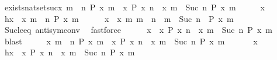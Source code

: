 \begin{isabellebody}
\isadelimproof
\isanewline
%
\endisadelimproof
\isanewline
{}\isamarkupfalse%
\ exists{\isacharunderscore}nat{\isacharunderscore}set{\isacharunderscore}suc{\isacharcolon}{\isacartoucheopen}{\isacharbraceleft}x{\isachardot}\ {\isasymexists}m\ {\isasymge}\ n{\isachardot}\ P\ x\ m{\isacharbraceright}\ {\isacharequal}\ {\isacharbraceleft}x{\isachardot}\ P\ x\ n{\isacharbraceright}\ {\isasymunion}\ {\isacharbraceleft}x{\isachardot}\ {\isasymexists}m\ {\isasymge}\ Suc\ n{\isachardot}\ P\ x\ m{\isacharbraceright}{\isacartoucheclose}\isanewline
%
\isadelimproof
%
\endisadelimproof
%
\isatagproof
{}\isamarkupfalse%
\isanewline
\ \ \isacommand{{\isacharbraceleft}}\isamarkupfalse%
\ \isamarkupfalse%
\ x\ \isamarkupfalse%
\ h{\isacharcolon}{\isacartoucheopen}x\ {\isasymin}\ {\isacharbraceleft}x{\isachardot}\ {\isasymexists}m\ {\isasymge}\ n{\isachardot}\ P\ x\ m{\isacharbraceright}{\isacartoucheclose}\isanewline
\ \ \ \ \isamarkupfalse%
\ {\isacartoucheopen}x\ {\isasymin}\ {\isacharbraceleft}x{\isachardot}\ {\isasymexists}m{\isachardot}\ {\isacharparenleft}m\ {\isacharequal}\ n\ {\isasymor}\ m\ {\isasymge}\ Suc\ n{\isacharparenright}\ {\isasymand}\ P\ x\ m{\isacharbraceright}{\isacartoucheclose}\isanewline
\ \ \ \ \ \ \isamarkupfalse%
\ Suc{\isacharunderscore}le{\isacharunderscore}eq\ antisym{\isacharunderscore}conv{}\ \isamarkupfalse%
\ fastforce\isanewline
\ \ \ \ \isamarkupfalse%
\ {\isacartoucheopen}x\ {\isasymin}\ {\isacharbraceleft}x{\isachardot}\ P\ x\ n{\isacharbraceright}\ {\isasymunion}\ {\isacharbraceleft}x{\isachardot}\ {\isasymexists}m\ {\isasymge}\ Suc\ n{\isachardot}\ P\ x\ m{\isacharbraceright}{\isacartoucheclose}\ \isamarkupfalse%
\ blast\isanewline
\ \ \isacommand{{\isacharbraceright}}\isamarkupfalse%
\ \isamarkupfalse%
\ {\isacartoucheopen}{\isacharbraceleft}x{\isachardot}\ {\isasymexists}m\ {\isasymge}\ n{\isachardot}\ P\ x\ m{\isacharbraceright}\ {\isasymsubseteq}\ {\isacharbraceleft}x{\isachardot}\ P\ x\ n{\isacharbraceright}\ {\isasymunion}\ {\isacharbraceleft}x{\isachardot}\ {\isasymexists}m\ {\isasymge}\ Suc\ n{\isachardot}\ P\ x\ m{\isacharbraceright}{\isacartoucheclose}\ \isacommand{{\isachardot}{\isachardot}}\isamarkupfalse%
\isanewline
{}\isamarkupfalse%
\isanewline
\ \ \isacommand{{\isacharbraceleft}}\isamarkupfalse%
\ \isamarkupfalse%
\ x\ \ \isamarkupfalse%
\ h{\isacharcolon}{\isacartoucheopen}x\ {\isasymin}\ {\isacharbraceleft}x{\isachardot}\ P\ x\ n{\isacharbraceright}\ {\isasymunion}\ {\isacharbraceleft}x{\isachardot}\ {\isasymexists}m\ {\isasymge}\ Suc\ n{\isachardot}\ P\ x\ m{\isacharbraceright}{\isacartoucheclose}\isanewline

\end{isabellebody}
